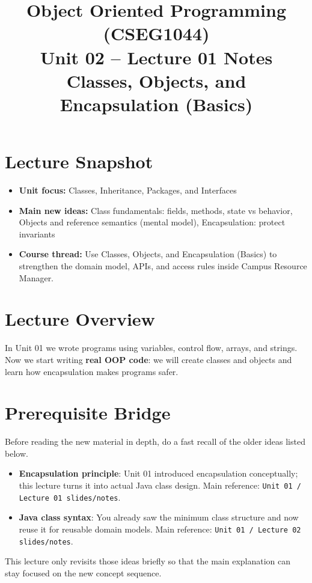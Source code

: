 \documentclass[11pt]{article}
\title{Object Oriented Programming (CSEG1044)\\Unit 02 -- Lecture 01 Notes\\Classes, Objects, and Encapsulation (Basics)}
\begin{document}
\maketitle
\tableofcontents

\section{Lecture Snapshot}
\begin{itemize}
  \item \textbf{Unit focus:} Classes, Inheritance, Packages, and Interfaces
  \item \textbf{Main new ideas:} Class fundamentals: fields, methods, state vs behavior, Objects and reference semantics (mental model), Encapsulation: protect invariants
  \item \textbf{Course thread:} Use Classes, Objects, and Encapsulation (Basics) to strengthen the domain model, APIs, and access rules inside Campus Resource Manager.
\end{itemize}
\notesources{\OOPSUnitIISources}

\section{Lecture Overview}
In Unit 01 we wrote programs using variables, control flow, arrays, and strings.
Now we start writing \textbf{real OOP code}: we will create classes and objects and learn how encapsulation makes programs safer.
\notesources{\OOPSUnitIISources}

\section{Prerequisite Bridge}
Before reading the new material in depth, do a fast recall of the older ideas listed below.
\begin{itemize}
  \item \textbf{Encapsulation principle}: Unit 01 introduced encapsulation conceptually; this lecture turns it into actual Java class design. Main reference: \texttt{Unit 01 / Lecture 01 slides/notes}.
  \item \textbf{Java class syntax}: You already saw the minimum class structure and now reuse it for reusable domain models. Main reference: \texttt{Unit 01 / Lecture 02 slides/notes}.
\end{itemize}
This lecture only revisits those ideas briefly so that the main explanation can stay focused on the new concept sequence.
\notesources{\OOPSUnitIISources}
\end{document}
